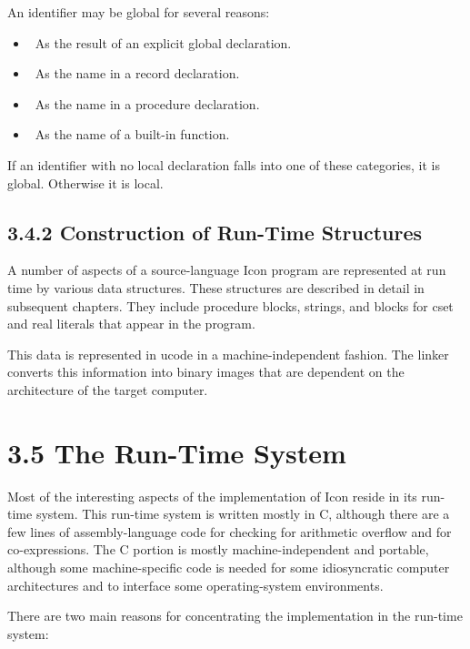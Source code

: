 An identifier may be global for several reasons:

\liststyleLii
\begin{itemize}
\item 
\ As the result of an explicit global declaration.
\item 
\ As the name in a record declaration.
\item 
\ As the name in a procedure declaration.
\item 
\ As the name of a built-in function.
\end{itemize}

If an identifier with no local declaration falls into one of these
categories, it is global. Otherwise it is local.

\subsection[3.4.2 Construction of Run-Time Structures]{3.4.2 Construction of Run-Time Structures}

A number of aspects of a source-language Icon program are represented
at run time by various data structures. These structures are described
in detail in subsequent chapters. They include procedure blocks,
strings, and blocks for cset and real literals that appear in the
program.


This data is represented in ucode in a machine-independent
fashion. The linker converts this information into binary images that
are dependent on the architecture of the target computer.

\section[3.5 The Run{}-Time System]{3.5 The Run-Time System}

Most of the interesting aspects of the implementation of Icon reside
in its run-time system. This run-time system is written mostly in C,
although there are a few lines of assembly-language code for checking
for arithmetic overflow and for co-expressions. The C portion is
mostly machine-independent and portable, although some
machine-specific code is needed for some idiosyncratic computer
architectures and to interface some operating-system environments.

There are two main reasons for concentrating the implementation in the
run-time system:

